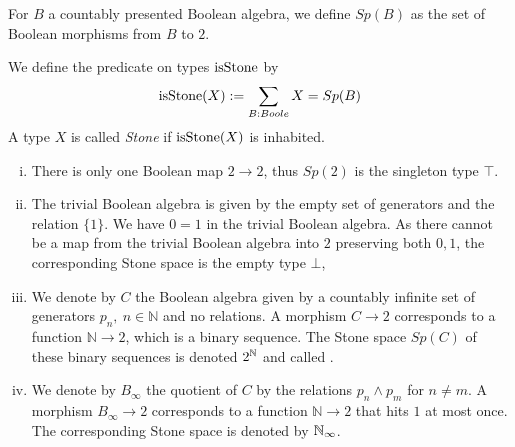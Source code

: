 \begin{definition}
  For $B$ a countably presented Boolean algebra, we define $Sp(B)$ as the set of Boolean morphisms from $B$ to $2$. 
\end{definition}
\begin{definition}
  We define the predicate on types $\mathrm{isStone}$ by 
  \begin{equation}
    \mathrm{isStone}(X) := \sum\limits_{B : Boole} X = Sp(B)
  \end{equation} 
  A type $X$ is called \textit{Stone} if $\mathrm{isStone}(X)$ is inhabited.
\end{definition}


\begin{example}
  \label{boolean-algebra-examples}
  \begin{enumerate}[(i)]
    \item There is only one Boolean map $2\to 2$, thus $Sp(2)$ is the singleton type $\top$. 
  \item   The trivial Boolean algebra is given by the empty set of generators and the relation $\{1\}$.
    We have $0=1$ in the trivial Boolean algebra. 
    As there cannot be a map from the trivial Boolean algebra into $2$ preserving both $0,1$, 
    the corresponding Stone space is the empty type $\bot$, 
  \item\label{ExampleBAunderCantor}   
    We denote by $C$ the Boolean algebra given by a countably infinite set of generators $p_n, ~n\in\mathbb N$ and no relations. 
    A morphism $C\to 2$ corresponds to a function $\mathbb N\to 2$, which is a binary sequence. 
    The Stone space $Sp(C)$ of these binary sequences is denoted $2^{\mathbb{N}}$ and called .
  \item\label{ExampleBAunderNinfty}
    We denote by $B_\infty$ the quotient of $C$ by the relations $p_n\wedge p_m$ for $n\neq m$. 
    A morphism $B_\infty\to 2$ corresponds to a function $\mathbb N \to 2$ that hits $1$ at most once. 
    The corresponding Stone space is denoted by $\mathbb{N}_\infty$. 
  \end{enumerate}
\end{example}

